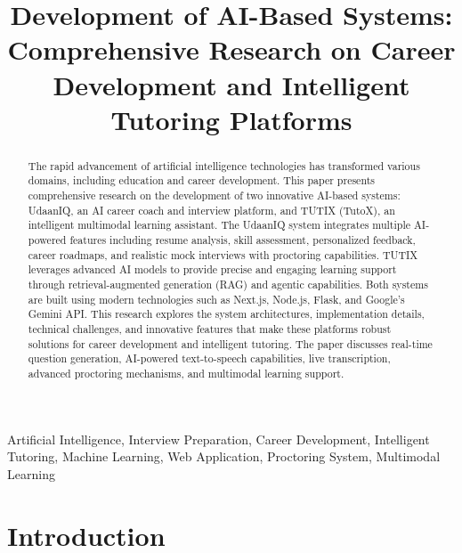 \documentclass[12pt, conference]{IEEEtran}
\begin{document}
\title{Development of AI-Based Systems: Comprehensive Research on Career Development and Intelligent Tutoring Platforms}

\author{
}

\maketitle

\begin{abstract}
The rapid advancement of artificial intelligence technologies has transformed various domains, including education and career development. This paper presents comprehensive research on the development of two innovative AI-based systems: UdaanIQ, an AI career coach and interview platform, and TUTIX (TutoX), an intelligent multimodal learning assistant. The UdaanIQ system integrates multiple AI-powered features including resume analysis, skill assessment, personalized feedback, career roadmaps, and realistic mock interviews with proctoring capabilities. TUTIX leverages advanced AI models to provide precise and engaging learning support through retrieval-augmented generation (RAG) and agentic capabilities. Both systems are built using modern technologies such as Next.js, Node.js, Flask, and Google's Gemini API. This research explores the system architectures, implementation details, technical challenges, and innovative features that make these platforms robust solutions for career development and intelligent tutoring. The paper discusses real-time question generation, AI-powered text-to-speech capabilities, live transcription, advanced proctoring mechanisms, and multimodal learning support.
\end{abstract}

\begin{IEEEkeywords}
Artificial Intelligence, Interview Preparation, Career Development, Intelligent Tutoring, Machine Learning, Web Application, Proctoring System, Multimodal Learning
\end{IEEEkeywords}

\section{Introduction}
\end{document}
